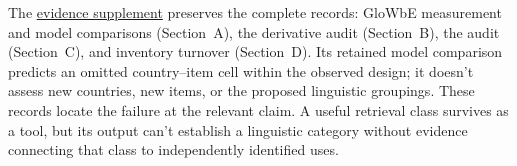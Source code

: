The \href{inquiry-relative-evidence-supplement.pdf}{evidence supplement}
preserves the complete records: GloWbE measurement and model comparisons
(Section~A), the derivative audit (Section~B), the  audit
(Section~C), and inventory turnover (Section~D). Its retained model
comparison predicts an omitted country--item cell within the observed
design; it doesn't assess new countries, new items, or the proposed
linguistic groupings. These records locate
the failure at the relevant claim. A useful retrieval class survives
as a tool, but its output can't establish a linguistic category
without evidence connecting that class to independently identified uses.
